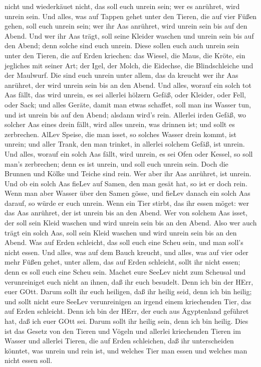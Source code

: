 nicht und wiederkäuet nicht, das soll euch unrein sein; wer es anrühret,
wird unrein sein.  Und alles, was auf Tappen gehet unter
den Tieren, die auf vier Füßen gehen, soll euch unrein sein; wer ihr Aas
anrühret, wird unrein sein bis auf den Abend.  Und wer ihr
Aas trägt, soll seine Kleider waschen und unrein sein bis auf den Abend;
denn solche sind euch unrein.  Diese sollen euch auch
unrein sein unter den Tieren, die auf Erden kriechen: das Wiesel, die
Maus, die Kröte, ein jegliches mit seiner Art;  der Igel,
der Molch, die Eidechse, die Blindschleiche und der Maulwurf.
 Die sind euch unrein unter allem, das da kreucht wer ihr
Aas anrühret, der wird unrein sein bis an den Abend.  Und
alles, worauf ein solch tot Aas fällt, das wird unrein, es sei allerlei
hölzern Gefäß, oder Kleider, oder Fell, oder Sack; und alles Geräte,
damit man etwas schaffet, soll man ins Wasser tun, und ist unrein bis
auf den Abend; alsdann wird's rein.  Allerlei irden Gefäß,
wo solcher Aas eines drein fällt, wird alles unrein, was drinnen ist;
und sollt es zerbrechen.  AlLev Speise, die man isset, so
solches Wasser drein kommt, ist unrein; und aller Trank, den man
trinket, in allerlei solchem Gefäß, ist unrein.  Und alles,
worauf ein solch Aas fällt, wird unrein, es sei Ofen oder Kessel, so
soll man's zerbrechen; denn es ist unrein, und soll euch unrein sein.
 Doch die Brunnen und Kölke und Teiche sind rein. Wer aber
ihr Aas anrühret, ist unrein.  Und ob ein solch Aas fieLev
auf Samen, den man gesät hat, so ist er doch rein.  Wenn
man aber Wasser über den Samen gösse, und fieLev danach ein solch Aas
darauf, so würde er euch unrein.  Wenn ein Tier stirbt, das
ihr essen möget: wer das Aas anrühret, der ist unrein bis an den Abend.
 Wer von solchem Aas isset, der soll sein Kleid waschen und
wird unrein sein bis an den Abend. Also wer auch trägt ein solch Aas,
soll sein Kleid waschen und wird unrein sein bis an den Abend.
 Was auf Erden schleicht, das soll euch eine Scheu sein,
und man soll's nicht essen.  Und alles, was auf dem Bauch
kreucht, und alles, was auf vier oder mehr Füßen gehet, unter allem, das
auf Erden schleicht, sollt ihr nicht essen; denn es soll euch eine Scheu
sein.  Machet eure SeeLev nicht zum Scheusal und
verunreiniget euch nicht an ihnen, daß ihr euch besudelt. 
Denn ich bin der HErr, euer GOtt. Darum sollt ihr euch heiligen, daß ihr
heilig seid, denn ich bin heilig; und sollt nicht eure SeeLev
verunreinigen an irgend einem kriechenden Tier, das auf Erden schleicht.
 Denn ich bin der HErr, der euch aus Ägyptenland geführet
hat, daß ich euer GOtt sei. Darum sollt ihr heilig sein, denn ich bin
heilig.  Dies ist das Gesetz von den Tieren und Vögeln und
allerlei kriechenden Tieren im Wasser und allerlei Tieren, die auf Erden
schleichen,  daß ihr unterscheiden könntet, was unrein und
rein ist, und welches Tier man essen und welches man nicht essen soll.


